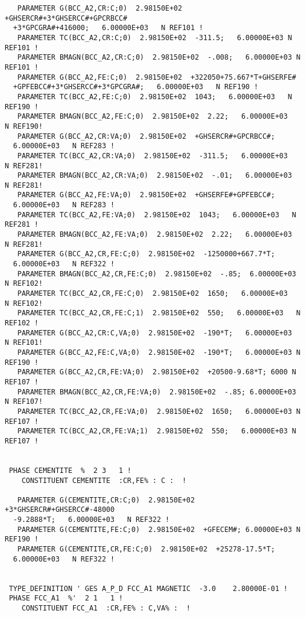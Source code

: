 \documentclass[12pt]{article}
\begin{document}
\begin{verbatim}
   PARAMETER G(BCC_A2,CR:C;0)  2.98150E+02  +GHSERCR#+3*GHSERCC#+GPCRBCC#
  +3*GPCGRA#+416000;   6.00000E+03   N REF101 !
   PARAMETER TC(BCC_A2,CR:C;0)  2.98150E+02  -311.5;   6.00000E+03 N REF101 !
   PARAMETER BMAGN(BCC_A2,CR:C;0)  2.98150E+02  -.008;   6.00000E+03 N REF101 !
   PARAMETER G(BCC_A2,FE:C;0)  2.98150E+02  +322050+75.667*T+GHSERFE#
  +GPFEBCC#+3*GHSERCC#+3*GPCGRA#;   6.00000E+03   N REF190 !
   PARAMETER TC(BCC_A2,FE:C;0)  2.98150E+02  1043;   6.00000E+03   N REF190 !
   PARAMETER BMAGN(BCC_A2,FE:C;0)  2.98150E+02  2.22;   6.00000E+03   N REF190!
   PARAMETER G(BCC_A2,CR:VA;0)  2.98150E+02  +GHSERCR#+GPCRBCC#;   
  6.00000E+03   N REF283 !
   PARAMETER TC(BCC_A2,CR:VA;0)  2.98150E+02  -311.5;   6.00000E+03   N REF281!
   PARAMETER BMAGN(BCC_A2,CR:VA;0)  2.98150E+02  -.01;   6.00000E+03  N REF281!
   PARAMETER G(BCC_A2,FE:VA;0)  2.98150E+02  +GHSERFE#+GPFEBCC#;   
  6.00000E+03   N REF283 !
   PARAMETER TC(BCC_A2,FE:VA;0)  2.98150E+02  1043;   6.00000E+03   N REF281 !
   PARAMETER BMAGN(BCC_A2,FE:VA;0)  2.98150E+02  2.22;   6.00000E+03  N REF281!
   PARAMETER G(BCC_A2,CR,FE:C;0)  2.98150E+02  -1250000+667.7*T;   
  6.00000E+03   N REF322 !
   PARAMETER BMAGN(BCC_A2,CR,FE:C;0)  2.98150E+02  -.85;  6.00000E+03 N REF102!
   PARAMETER TC(BCC_A2,CR,FE:C;0)  2.98150E+02  1650;   6.00000E+03   N REF102!
   PARAMETER TC(BCC_A2,CR,FE:C;1)  2.98150E+02  550;   6.00000E+03   N REF102 !
   PARAMETER G(BCC_A2,CR:C,VA;0)  2.98150E+02  -190*T;   6.00000E+03  N REF101!
   PARAMETER G(BCC_A2,FE:C,VA;0)  2.98150E+02  -190*T;   6.00000E+03 N REF190 !
   PARAMETER G(BCC_A2,CR,FE:VA;0)  2.98150E+02  +20500-9.68*T; 6000 N REF107 !
   PARAMETER BMAGN(BCC_A2,CR,FE:VA;0)  2.98150E+02  -.85; 6.00000E+03 N REF107!
   PARAMETER TC(BCC_A2,CR,FE:VA;0)  2.98150E+02  1650;   6.00000E+03 N REF107 !
   PARAMETER TC(BCC_A2,CR,FE:VA;1)  2.98150E+02  550;   6.00000E+03 N  REF107 !


 PHASE CEMENTITE  %  2 3   1 !
    CONSTITUENT CEMENTITE  :CR,FE% : C :  !

   PARAMETER G(CEMENTITE,CR:C;0)  2.98150E+02  +3*GHSERCR#+GHSERCC#-48000
  -9.2888*T;   6.00000E+03   N REF322 !
   PARAMETER G(CEMENTITE,FE:C;0)  2.98150E+02  +GFECEM#; 6.00000E+03 N REF190 !
   PARAMETER G(CEMENTITE,CR,FE:C;0)  2.98150E+02  +25278-17.5*T;   
  6.00000E+03   N REF322 !


 TYPE_DEFINITION ' GES A_P_D FCC_A1 MAGNETIC  -3.0    2.80000E-01 !
 PHASE FCC_A1  %'  2 1   1 !
    CONSTITUENT FCC_A1  :CR,FE% : C,VA% :  !


\end{verbatim}
\end{document}
